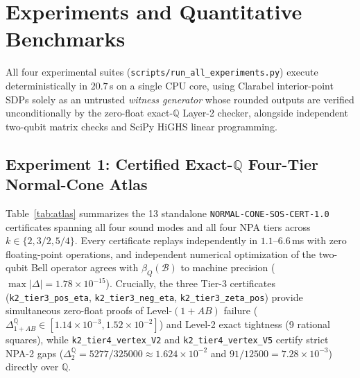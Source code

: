 \documentclass[11pt,a4paper]{article}
\newcommand{\QQ}{\mathbb{Q}}
\newcommand{\calB}{\mathcal{B}}
\begin{document}
\section{Experiments and Quantitative Benchmarks}
\label{sec:experiments}

All four experimental suites (\texttt{scripts/run\_all\_experiments.py}) execute deterministically in $20.7$\,s on a single CPU core, using Clarabel interior-point SDPs solely as an untrusted \emph{witness generator} whose rounded outputs are verified unconditionally by the zero-float exact-$\QQ$ Layer-2 checker, alongside independent two-qubit matrix checks and SciPy HiGHS linear programming.

\subsection{Experiment 1: Certified \texorpdfstring{Exact-$\QQ$}{Exact-Q} Four-Tier Normal-Cone Atlas}

Table~\ref{tab:atlas} summarizes the 13 standalone \texttt{NORMAL-CONE-SOS-CERT-1.0} certificates spanning all four sound modes and all four NPA tiers across $k \in \{2, 3/2, 5/4\}$.
Every certificate replays independently in $1.1$--$6.6$\,ms with zero floating-point operations, and independent numerical optimization of the two-qubit Bell operator agrees with $\beta_Q(\calB)$ to machine precision ($\max |\Delta| = 1.78 \times 10^{-15}$).
Crucially, the three Tier-3 certificates (\texttt{k2\_tier3\_pos\_eta}, \texttt{k2\_tier3\_neg\_eta}, \texttt{k2\_tier3\_zeta\_pos}) provide simultaneous zero-float proofs of Level-$(1+AB)$ failure ($\Delta_{1+AB}^{\QQ} \in [1.14 \times 10^{-3}, 1.52 \times 10^{-2}]$) and Level-2 exact tightness (9 rational squares), while \texttt{k2\_tier4\_vertex\_V2} and \texttt{k2\_tier4\_vertex\_V5} certify strict NPA-2 gaps ($\Delta_2^{\QQ} = 5277/325000 \approx 1.624\times 10^{-2}$ and $91/12500 = 7.28\times 10^{-3}$) directly over $\QQ$.
\end{document}
